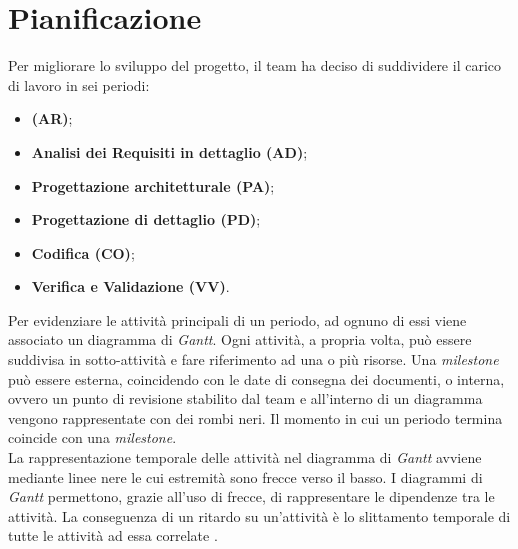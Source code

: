 \newpage
\section{Pianificazione}
Per migliorare lo sviluppo del progetto, il team ha deciso di suddividere il carico di lavoro in sei periodi:
\begin{itemize}
	\item \textbf{\AdR (AR)};
	\item \textbf{Analisi dei Requisiti in dettaglio (AD)};
	\item \textbf{Progettazione architetturale (PA)};
	\item \textbf{Progettazione di dettaglio (PD)};
	\item \textbf{Codifica (CO)};
	\item \textbf{Verifica e Validazione (VV)}.
\end{itemize}

Per evidenziare le attività principali di un periodo, ad ognuno di essi viene associato un diagramma di \textit{Gantt}. 
Ogni attività, a propria volta, può essere suddivisa in sotto-attività e fare riferimento ad una o più risorse.
Una \textit{milestone} può essere esterna, coincidendo con le date di consegna dei documenti, o interna, ovvero un punto di revisione stabilito dal team e all'interno di un diagramma vengono rappresentate con dei rombi neri. Il momento in cui un periodo termina coincide con una \textit{milestone}.\\ 
La rappresentazione temporale delle attività nel diagramma di \textit{Gantt} avviene mediante linee nere le cui estremità sono frecce verso il basso. 
I diagrammi di \textit{Gantt} permettono, grazie all'uso di frecce, di rappresentare le dipendenze tra le attività.
La conseguenza di un ritardo su un'attività è lo slittamento temporale di tutte le attività ad essa correlate . \\

